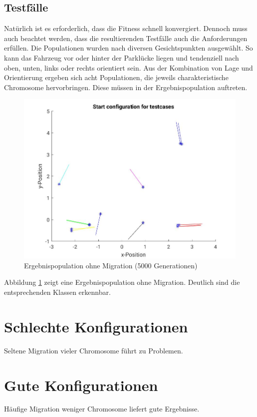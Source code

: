 \documentclass[12pt,a4paper]{article}
\begin{document}
\subsection{Testfälle}
Natürlich ist es erforderlich, dass die Fitness schnell konvergiert. Dennoch muss auch beachtet werden, dass die resultierenden Testfälle auch die Anforderungen erfüllen. Die Populationen wurden nach diversen Gesichtspunkten ausgewählt. So kann das Fahrzeug vor oder hinter der Parklücke liegen und tendenziell nach oben, unten, links oder rechts orientiert sein. Aus der Kombination von Lage und Orientierung ergeben sich acht Populationen, die jeweils charakteristische Chromosome hervorbringen. Diese müssen in der Ergebnispopulation auftreten.
\begin{figure}
\centering
\includegraphics[width=.8\textwidth]{plain-tcs.jpg}
\caption{Ergebnispopulation ohne Migration (5000 Generationen)}
\label{fig:plain_tcs}
\end{figure}
Abbildung \ref{fig:plain_tcs} zeigt eine Ergebnispopulation ohne Migration. Deutlich sind die entsprechenden Klassen erkennbar.

\section{Schlechte Konfigurationen}
Seltene Migration vieler Chromosome führt zu Problemen.

\section{Gute Konfigurationen}
Häufige Migration weniger Chromosome liefert gute Ergebnisse.
\end{document}

